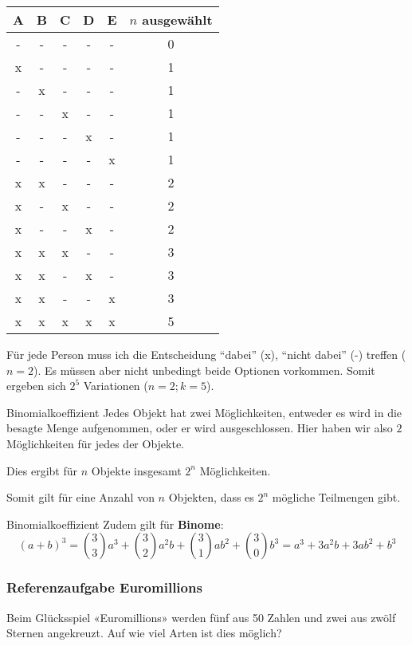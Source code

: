 \begin{tabular}{ccccc|c}
A&B&C&D&E&$n$ ausgewählt \\\hline
-&-&-&-&-&0\\
x&-&-&-&-&1\\
-&x&-&-&-&1\\
-&-&x&-&-&1\\
-&-&-&x&-&1\\
-&-&-&-&x&1\\
x&x&-&-&-&2\\
x&-&x&-&-&2\\
x&-&-&x&-&2\\
\hline
\hline
x&x&x&-&-&3\\
x&x&-&x&-&3\\
x&x&-&-&x&3\\
\hline \hline
x&x&x&x&x&5\\\hline
\end{tabular}

Für jede Person muss ich die Entscheidung ``dabei'' (x), ``nicht dabei'' (-) treffen ($n=2$). Es müssen aber nicht unbedingt beide Optionen vorkommen. Somit ergeben sich $2^5$ Variationen ($n=2; k=5$).


\begin{bemerkung}{Binomialkoeffizient}{}
  Jedes Objekt hat zwei Möglichkeiten, entweder es wird in die besagte
  Menge aufgenommen, oder er wird ausgeschlossen. Hier haben wir also
  $2$ Möglichkeiten für jedes der Objekte.
  
  Dies ergibt für $n$ Objekte insgesamt $2^n$ Möglichkeiten.

  Somit gilt für eine Anzahl von $n$ Objekten, dass es $2^n$ mögliche
  Teilmengen gibt.
\end{bemerkung}
\newpage


\begin{bemerkung}{Binomialkoeffizient}{}
  Zudem gilt für \textbf{Binome}:
  $$(a+b)^3 = {3\choose 3} a^3+ {3\choose 2} a^2b + {3\choose1} ab^2 + {3\choose 0}b^3 = a^3 + 3a^2b + 3ab^2 + b^3$$
  $$$$
  \end{bemerkung}

\subsubsection{Referenzaufgabe Euromillions}
Beim Glücksspiel «Euromillions» werden fünf aus 50 Zahlen und zwei aus zwölf Sternen angekreuzt. Auf wie viel Arten ist dies möglich?


